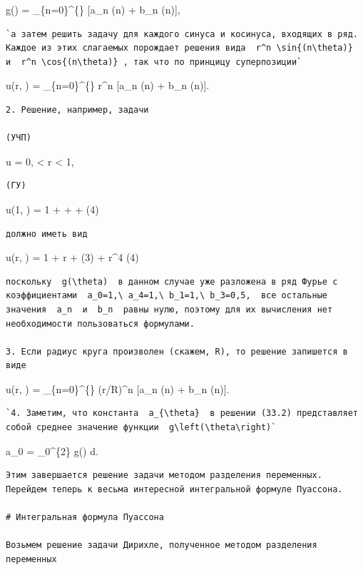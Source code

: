 \documentclass[
  ukrainian,
]{article}
\begin{document}
g(\theta) = \sum\_\{n=0\}\^{}\{\infty\} {[}a\_n \cos(n\theta) + b\_n
\sin(n\theta){]},

\begin{verbatim}
`а затем решить задачу для каждого синуса и косинуса, входящих в ряд. Каждое из этих слагаемых порождает решения вида  r^n \sin{(n\theta)}  и  r^n \cos{(n\theta)} , так что по принцицу суперпозиции`
\end{verbatim}

u(r, \theta) = \sum\_\{n=0\}\^{}\{\infty\} r\^{}n {[}a\_n \cos(n\theta)
+ b\_n \sin(n\theta){]}.

\begin{verbatim}
2. Решение, например, задачи

(УЧП)
\end{verbatim}

\Delta u = 0,  \textless{} r \textless{} 1,

\begin{verbatim}
(ГУ)
\end{verbatim}

u(1, \theta) = 1 + \sin \theta +  \theta +
\cos (4\theta)

\begin{verbatim}
должно иметь вид
\end{verbatim}

u(r, \theta) = 1 + r \sin \theta +  \sin (3\theta) + r\^{}4
\cos (4\theta)

\begin{verbatim}
поскольку  g(\theta)  в данном случае уже разложена в ряд Фурье с коэффициентами  a_0=1,\ a_4=1,\ b_1=1,\ b_3=0,5,  все остальные значения  a_n  и  b_n  равны нулю, поэтому для их вычисления нет необходимости пользоваться формулами.

3. Если радиус круга произволен (скажем, R), то решение запишется в виде
\end{verbatim}

u(r, \theta) = \sum\_\{n=0\}\^{}\{\infty\} (r/R)\^{}n {[}a\_n
\cos(n\theta) + b\_n \sin(n\theta){]}.

\begin{verbatim}
`4. Заметим, что константа  a_{\theta}  в решении (33.2) представляет собой среднее значение функции  g\left(\theta\right)`
\end{verbatim}

a\_0 =  \int\_0\^{}\{2\pi\} g(\theta) d\theta.

\begin{verbatim}
Этим завершается решение задачи методом разделения переменных. Перейдем теперь к весьма интересной интегральной формуле Пуассона.

# Интегральная формула Пуассона

Возьмем решение задачи Дирихле, полученное методом разделения переменных
\end{verbatim}
\end{document}
